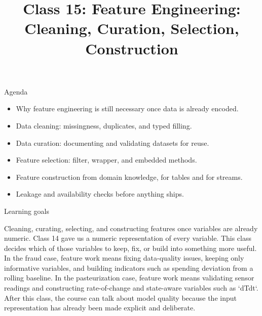 

\title{Class 15: Feature Engineering: Cleaning, Curation, Selection, Construction}
\author{\coursename}
\date{}



\frame{\titlepage \coursefooter}

\begin{frame}{Agenda}
\begin{itemize}
\item Why feature engineering is still necessary once data is already encoded.
\item Data cleaning: missingness, duplicates, and typed filling.
\item Data curation: documenting and validating datasets for reuse.
\item Feature selection: filter, wrapper, and embedded methods.
\item Feature construction from domain knowledge, for tables and for streams.
\item Leakage and availability checks before anything ships.
\end{itemize}
\coursefooter
\end{frame}

\begin{frame}{Learning goals}
\coursefooter
\end{frame}

\coursecontextframe
{Cleaning, curating, selecting, and constructing features once variables are already numeric.}
{Class 14 gave us a numeric representation of every variable. This class decides which of those variables to keep, fix, or build into something more useful.}
{In the fraud case, feature work means fixing data-quality issues, keeping only informative variables, and building indicators such as spending deviation from a rolling baseline.}
{In the pasteurization case, feature work means validating sensor readings and constructing rate-of-change and state-aware variables such as `dTdt`.}
{After this class, the course can talk about model quality because the input representation has already been made explicit and deliberate.}

